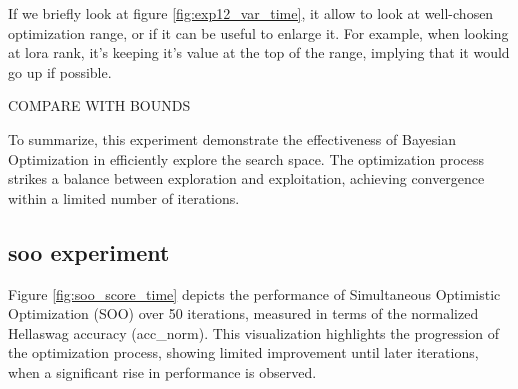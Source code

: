 If we briefly look at figure \ref{fig:exp12_var_time}, it allow to look at well-chosen optimization range, or if it can be useful to enlarge it. For example, when looking at \acrshort{lora} rank, it's keeping it's value at the top of the range, implying that it would go up if possible. 

COMPARE WITH BOUNDS


To summarize, this experiment demonstrate the effectiveness of Bayesian Optimization in efficiently explore the search space. The optimization process strikes a balance between exploration and exploitation, achieving convergence within a limited number of iterations.


\subsection{\acrshort{soo} experiment}
\label{sec:soo_exp}

Figure \ref{fig:soo_score_time} depicts the performance of Simultaneous Optimistic Optimization (SOO) over 50 iterations, measured in terms of the normalized Hellaswag accuracy (acc\_norm). This visualization highlights the progression of the optimization process, showing limited improvement until later iterations, when a significant rise in performance is observed.

